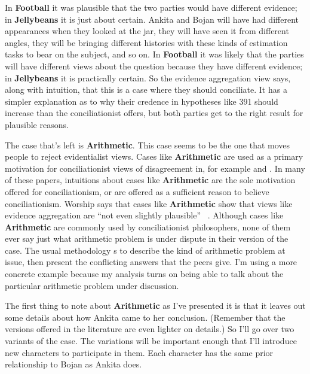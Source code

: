 In \textbf{Football} it was plausible that the two parties would have different evidence; in \textbf{Jellybeans} it is just about certain. \gls{Ankita} and \gls{Bojan} will have had different appearances when they looked at the jar, they will have seen it from different angles, they will be bringing different histories with these kinds of estimation tasks to bear on the subject, and so on. In \textbf{Football} it was likely that the parties will have different views about the question because they have different evidence; in \textbf{Jellybeans} it is practically certain. So the evidence aggregation view says, along with intuition, that this is a case where they should conciliate. It has a simpler explanation as to why their credence in hypotheses like 391 should increase than the conciliationist offers, but both parties get to the right result for plausible reasons.

The case that's left is \textbf{Arithmetic}. This case seems to be the one that moves people to reject evidentialist views. Cases like \textbf{Arithmetic} are used as a primary motivation for conciliationist views of disagreement in, for example \citet{Bogardus2009, Matheson2009, Carey2011, Kraft2012, Lee2013, Vavova2014, Worsnip2014, Mogensen2015} and \citet{Ebeling2017}. In many of these papers, intuitions about cases like \textbf{Arithmetic} are the sole motivation offered for conciliationism, or are offered as a sufficient reason to believe conciliationism. Worship says that cases like \textbf{Arithmetic} show that views like evidence aggregation are ``not even slightly plausible'' ~\citep[6]{Worsnip2014}. Although cases like \textbf{Arithmetic} are commonly used by conciliationist philosophers, none of them ever say just what arithmetic problem is under dispute in their version of the case. The usual methodology s to describe the kind of arithmetic problem at issue, then present the conflicting answers that the peers give. I'm using a more concrete example because my analysis turns on being able to talk about the particular arithmetic problem under discussion.

The first thing to note about \textbf{Arithmetic} as I've presented it is that it leaves out some details about how \gls{Ankita} came to her conclusion. (Remember that the versions offered in the literature are even lighter on details.) So I'll go over two variants of the case. The variations will be important enough that I'll introduce new characters to participate in them. Each character has the same prior relationship to \gls{Bojan} as \gls{Ankita} does.

